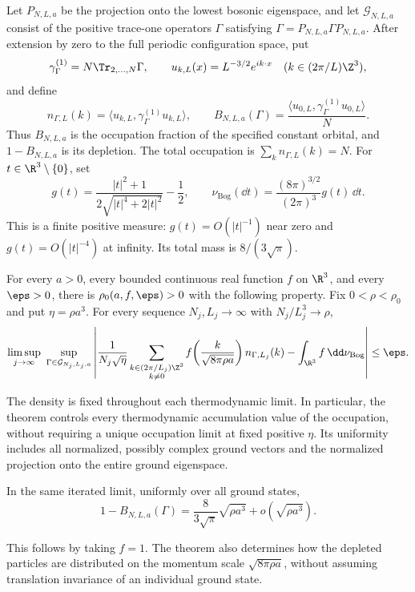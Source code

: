 Let $P_{N,L,a}$ be the projection onto the lowest bosonic eigenspace,
and let $\mathcal G_{N,L,a}$ consist of the positive trace-one operators
$\Gamma$ satisfying $\Gamma=P_{N,L,a}\Gamma P_{N,L,a}$. After extension
by zero to the full periodic configuration space, put
\[
 \gamma^{(1)}_\Gamma=N\Tr_{2,\ldots,N}\Gamma,
 \qquad u_{k,L}(x)=L^{-3/2}e^{ik\cdot x}\quad
                    (k\in(2\pi/L)\Z^3),
\]
and define
\[
 n_{\Gamma,L}(k)=\langle u_{k,L},\gamma^{(1)}_\Gamma u_{k,L}\rangle,
 \qquad
 B_{N,L,a}(\Gamma)=\frac{\langle u_{0,L},\gamma^{(1)}_\Gamma u_{0,L}\rangle}{N}.
\]
Thus $B_{N,L,a}$ is the occupation fraction of the specified constant
orbital, and $1-B_{N,L,a}$ is its depletion.
The total occupation is $\sum_k n_{\Gamma,L}(k)=N$.
For $t\in\R^3\setminus\{0\}$, set
\begin{equation}\label{intro:profile}
 g(t)=\frac{|t|^2+1}{2\sqrt{|t|^4+2|t|^2}}-\frac12,
 \qquad
 \nu_{\mathrm{Bog}}(\dd t)
       =\frac{(8\pi)^{3/2}}{(2\pi)^3}g(t)\,\dd t.
\end{equation}
This is a finite positive measure: $g(t)=O(|t|^{-1})$ near zero
and $g(t)=O(|t|^{-4})$ at infinity. Its total mass is $8/(3\sqrt\pi)$.

\begin{theorem}\label{thm:main}
For every $a>0$, every bounded continuous real function $f$ on $\R^3$,
and every $\eps>0$, there is $\rho_0(a,f,\eps)>0$ with the following
property. Fix $0<\rho<\rho_0$ and put $\eta=\rho a^3$. For every
sequence $N_j,L_j\longrightarrow\infty$ with
$N_j/L_j^3\longrightarrow\rho$,
\begin{equation}\label{intro:main-limit}
 \limsup_{j\to\infty}\ \sup_{\Gamma\in\mathcal G_{N_j,L_j,a}}
 \left|
 \frac{1}{N_j\sqrt\eta}
 \sum_{\substack{k\in(2\pi/L_j)\Z^3\\k\ne0}}
 f\!\left(\frac{k}{\sqrt{8\pi\rho a}}\right)n_{\Gamma,L_j}(k)
       -\int_{\R^3}f\,\dd\nu_{\mathrm{Bog}}
 \right|\le\eps.
\end{equation}
\end{theorem}

The density is fixed throughout each thermodynamic limit. In particular,
the theorem controls every thermodynamic accumulation value of the
occupation, without requiring a unique occupation limit at fixed
positive $\eta$. Its uniformity includes all normalized, possibly
complex ground vectors and the normalized projection onto the entire
ground eigenspace.

\begin{corollary}\label{cor:depletion}
In the same iterated limit, uniformly over all ground states,
\[
 1-B_{N,L,a}(\Gamma)
   =\frac8{3\sqrt\pi}\sqrt{\rho a^3}+o(\sqrt{\rho a^3}).
\]
\end{corollary}
This follows by taking $f=1$. The theorem also determines how the
depleted particles are distributed on the momentum scale
$\sqrt{8\pi\rho a}$, without assuming translation invariance of an
individual ground state.

